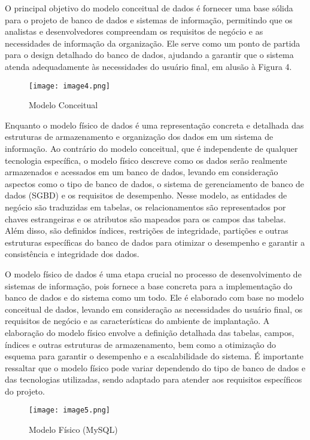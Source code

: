 \documentclass[12pt]{article}
\begin{document}
O principal objetivo do modelo conceitual de dados é fornecer uma base sólida para o projeto de banco de dados e sistemas de informação, permitindo que os analistas e desenvolvedores compreendam os requisitos de negócio e as necessidades de informação da organização. Ele serve como um ponto de partida para o design detalhado do banco de dados, ajudando a garantir que o sistema atenda adequadamente às necessidades do usuário final, em alusão à Figura 4.

\begin{figure}[H]
	\centering
	\texttt{[image: image4.png]}
	\caption{Modelo Conceitual}
	\label{fig:modelo_conceitual}
\end{figure}

Enquanto o modelo físico de dados é uma representação concreta e detalhada das estruturas de armazenamento e organização dos dados em um sistema de informação. Ao contrário do modelo conceitual, que é independente de qualquer tecnologia específica, o modelo físico descreve como os dados serão realmente armazenados e acessados em um banco de dados, levando em consideração aspectos como o tipo de banco de dados, o sistema de gerenciamento de banco de dados (SGBD) e os requisitos de desempenho. Nesse modelo, as entidades de negócio são traduzidas em tabelas, os relacionamentos são representados por chaves estrangeiras e os atributos são mapeados para os campos das tabelas. Além disso, são definidos índices, restrições de integridade, partições e outras estruturas específicas do banco de dados para otimizar o desempenho e garantir a consistência e integridade dos dados.

O modelo físico de dados é uma etapa crucial no processo de desenvolvimento de sistemas de informação, pois fornece a base concreta para a implementação do banco de dados e do sistema como um todo. Ele é elaborado com base no modelo conceitual de dados, levando em consideração as necessidades do usuário final, os requisitos de negócio e as características do ambiente de implantação. A elaboração do modelo físico envolve a definição detalhada das tabelas, campos, índices e outras estruturas de armazenamento, bem como a otimização do esquema para garantir o desempenho e a escalabilidade do sistema. É importante ressaltar que o modelo físico pode variar dependendo do tipo de banco de dados e das tecnologias utilizadas, sendo adaptado para atender aos requisitos específicos do projeto.

\begin{figure}[H]
	\centering
	\texttt{[image: image5.png]}
	\caption{Modelo Físico (MySQL)}
	\label{fig:modelo_fisico}
\end{figure}
\end{document}
